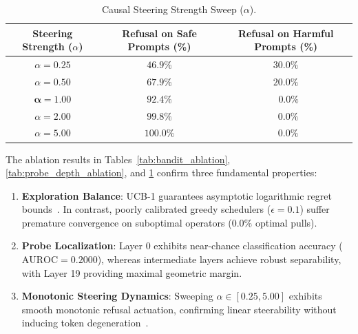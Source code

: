 \documentclass[manuscript,screen,review,anonymous]{acmart}
\begin{document}
\begin{table}[t]
  \caption{Causal Steering Strength Sweep ($\alpha$).}
  \label{tab:alpha_sweep}
  \begin{tabular}{ccc}
    \toprule
    Steering Strength ($\alpha$) & Refusal on Safe Prompts (\%) & Refusal on Harmful Prompts (\%) \\
    \midrule
    $\alpha = 0.25$ & $46.9\%$ & $30.0\%$ \\
    $\alpha = 0.50$ & $67.9\%$ & $20.0\%$ \\
    $\mathbf{\alpha = 1.00}$ & $\mathbf{92.4\%}$ & $\mathbf{\phantom{0}0.0\%}$ \\
    $\alpha = 2.00$ & $99.8\%$ & $\phantom{0}0.0\%$ \\
    $\alpha = 5.00$ & $100.0\%$ & $\phantom{0}0.0\%$ \\
    \bottomrule
  \end{tabular}
\end{table}

The ablation results in Tables~\ref{tab:bandit_ablation}, \ref{tab:probe_depth_ablation}, and \ref{tab:alpha_sweep} confirm three fundamental properties:
\begin{enumerate}[leftmargin=*]
    \item \textbf{Exploration Balance}: UCB-1 guarantees asymptotic logarithmic regret bounds~\cite{auer2002finite,bubeck2012regret}. In contrast, poorly calibrated greedy schedulers ($\epsilon=0.1$) suffer premature convergence on suboptimal operators ($0.0\%$ optimal pulls).
    \item \textbf{Probe Localization}: Layer 0 exhibits near-chance classification accuracy ($\text{AUROC}=0.2000$), whereas intermediate layers achieve robust separability, with Layer 19 providing maximal geometric margin.
    \item \textbf{Monotonic Steering Dynamics}: Sweeping $\alpha \in [0.25, 5.00]$ exhibits smooth monotonic refusal actuation, confirming linear steerability without inducing token degeneration~\cite{turner2023activation,rimsky2023steering,casper2023benchmarking}.
\end{enumerate}
\end{document}
